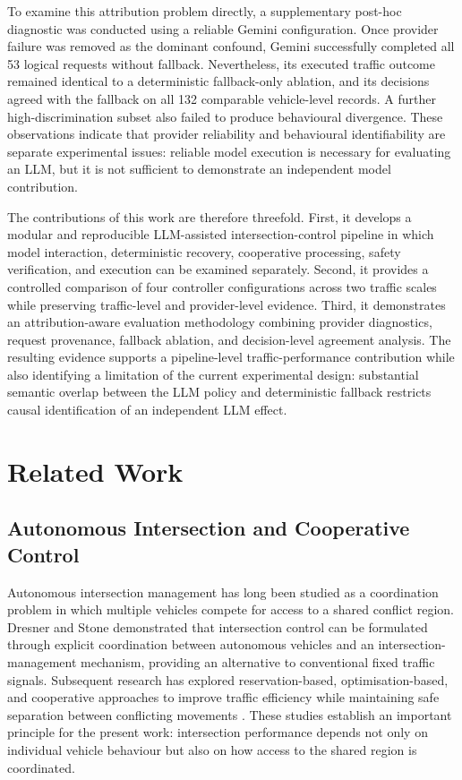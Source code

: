 \documentclass[letterpaper,10pt,conference]{ieeeconf}
\begin{document}
To examine this attribution problem directly, a supplementary post-hoc diagnostic was conducted using a reliable Gemini configuration. Once provider failure was removed as the dominant confound, Gemini successfully completed all 53 logical requests without fallback. Nevertheless, its executed traffic outcome remained identical to a deterministic fallback-only ablation, and its decisions agreed with the fallback on all 132 comparable vehicle-level records. A further high-discrimination subset also failed to produce behavioural divergence. These observations indicate that provider reliability and behavioural identifiability are separate experimental issues: reliable model execution is necessary for evaluating an LLM, but it is not sufficient to demonstrate an independent model contribution.



The contributions of this work are therefore threefold. First, it develops a modular and reproducible LLM-assisted intersection-control pipeline in which model interaction, deterministic recovery, cooperative processing, safety verification, and execution can be examined separately. Second, it provides a controlled comparison of four controller configurations across two traffic scales while preserving traffic-level and provider-level evidence. Third, it demonstrates an attribution-aware evaluation methodology combining provider diagnostics, request provenance, fallback ablation, and decision-level agreement analysis. The resulting evidence supports a pipeline-level traffic-performance contribution while also identifying a limitation of the current experimental design: substantial semantic overlap between the LLM policy and deterministic fallback restricts causal identification of an independent LLM effect.



\section{Related Work}



\subsection{Autonomous Intersection and Cooperative Control}



Autonomous intersection management has long been studied as a coordination problem in which multiple vehicles compete for access to a shared conflict region. Dresner and Stone \cite{Dresner2008} demonstrated that intersection control can be formulated through explicit coordination between autonomous vehicles and an intersection-management mechanism, providing an alternative to conventional fixed traffic signals. Subsequent research has explored reservation-based, optimisation-based, and cooperative approaches to improve traffic efficiency while maintaining safe separation between conflicting movements \cite{Safarov2022}. These studies establish an important principle for the present work: intersection performance depends not only on individual vehicle behaviour but also on how access to the shared region is coordinated.
\end{document}
